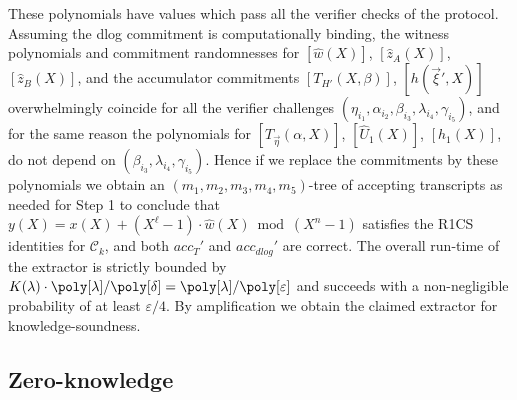 \documentclass[10pt,article,oneside]{memoir}
\theoremstyle{definition}
\theoremstyle{remark}
\DeclareMathOperator{\setup}{\mathsf{Setup}}
\begin{document}
These polynomials have values which pass all the verifier checks of the protocol.
Assuming the dlog commitment is computationally binding, the witness polynomials and commitment randomnesses for $[\hat w(X)]$, $[\hat z_A(X)]$, $[\hat z_B(X)]$, and the accumulator commitments $[T_{H'}(X,\beta)]$, $[h(\vec\xi',X)]$ overwhelmingly coincide for all the verifier challenges $(\eta_{i_1},\alpha_{i_2},\beta_{i_3},\lambda_{i_4},\gamma_{i_5})$, and for the same reason the polynomials for $[T_{\vec\eta} (\alpha,X)]$, $[\hat U_1(X)]$, $[h_1(X)]$, do not depend on $(\beta_{i_3},\lambda_{i_4},\gamma_{i_5})$.
Hence if we replace the commitments by these polynomials we obtain an $(m_1,m_2,m_3,m_4,m_5)$-tree of accepting transcripts as needed for Step 1 to conclude that  $y(X)=x(X)+(X^\ell-1)\cdot\hat w(X) \bmod (X^n-1)$ satisfies the R1CS identities for $\mathcal C_k$, and both $acc_T'$ and $acc_{dlog}'$ are correct. 
The overall run-time of the extractor is strictly bounded by $K(\lambda)\cdot \poly[\lambda]/\poly[\delta] = \poly[\lambda]/\poly[\varepsilon]$ and succeeds with a  non-negligible probability of at least $\varepsilon/4$.
By amplification we obtain the claimed extractor for knowledge-soundness.


\subsection{Zero-knowledge}
\end{document}
